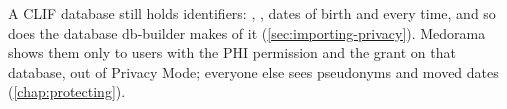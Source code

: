 \begin{phibox}
A CLIF database still holds identifiers: , , dates of
birth and every time, and so does the database db-builder makes of it (\cref{sec:importing-privacy}).
Medorama shows them only to users with the PHI permission and the grant  on that
database, out of Privacy Mode; everyone else sees pseudonyms and moved dates
(\cref{chap:protecting}).
\end{phibox}
